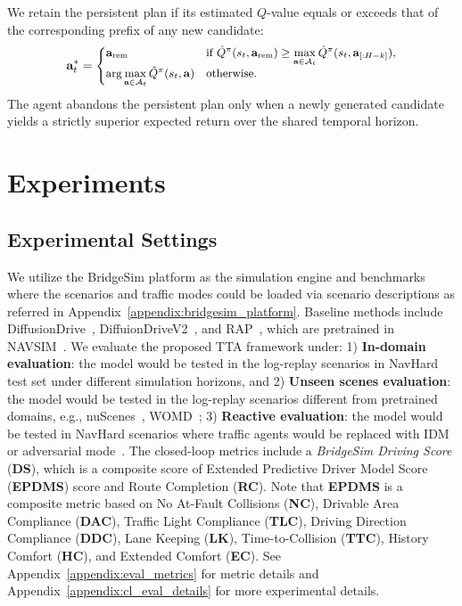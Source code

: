 \documentclass{article}
\begin{document}
We retain the persistent plan if its estimated $Q$-value equals or exceeds that of the corresponding prefix of any new candidate:
\begin{equation}
\small
    \mathbf{a}_t^* = 
    \begin{cases} 
        \mathbf{a}_{\mathrm{rem}} & \text{if } \hat{Q}^{\pi}(s_t, \mathbf{a}_{\mathrm{rem}}) \ge \max\limits_{\mathbf{a} \in \mathcal{A}_t} \hat{Q}^{\pi}(s_t, \mathbf{a}_{[:H-k]}), \\ 
        \arg\max\limits_{\mathbf{a} \in \mathcal{A}_t} \hat{Q}^{\pi}(s_t, \mathbf{a}) & \text{otherwise}.
    \end{cases}
\end{equation}
The agent abandons the persistent plan only when a newly generated candidate yields a strictly superior expected return over the shared temporal horizon.

\section{Experiments}
\label{section:experiments}

\subsection{Experimental Settings}
We utilize the BridgeSim platform as the simulation engine and benchmarks where the scenarios and traffic modes could be loaded via scenario descriptions as referred in Appendix~\ref{appendix:bridgesim_platform}. Baseline methods include DiffusionDrive~\cite{diffusiondrive}, DiffuionDriveV2~\cite{diffusiondrivev2}, and RAP~\cite{RAP}, which are pretrained in NAVSIM~\cite{navsimv2}. We evaluate the proposed TTA framework under: 1) \textbf{In-domain evaluation}: the model would be tested in the log-replay scenarios in NavHard test set under different simulation horizons, and 2) \textbf{Unseen scenes evaluation}: the model would be tested in the log-replay scenarios different from pretrained domains, e.g., nuScenes~\cite{caesar2020nuscenes}, WOMD~\cite{mei2022waymo}; 3) \textbf{Reactive evaluation}: the model would be tested in NavHard scenarios where traffic agents would be replaced with IDM~\cite{idm} or adversarial mode~\cite{advbmt}. The closed-loop metrics include a \textit{BridgeSim Driving Score} (\textbf{DS}), which is a composite score of Extended Predictive Driver Model Score (\textbf{EPDMS}) score and Route Completion (\textbf{RC}). Note that \textbf{EPDMS} is a composite metric based on No At-Fault Collisions (\textbf{NC}), Drivable Area Compliance (\textbf{DAC}), Traffic Light Compliance (\textbf{TLC}), Driving Direction Compliance (\textbf{DDC}), Lane Keeping (\textbf{LK}), Time-to-Collision (\textbf{TTC}), History Comfort (\textbf{HC}), and Extended Comfort (\textbf{EC}). See Appendix~\ref{appendix:eval_metrics} for metric details and Appendix~\ref{appendix:cl_eval_details} for more experimental details.
\end{document}
